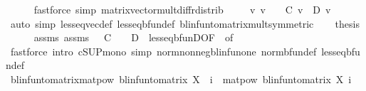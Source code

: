 \begin{isabellebody}
\ \ \ \ \isamarkupfalse%
\ {\isacharparenleft}{\kern0pt}fastforce\ simp{\isacharcolon}{\kern0pt}\ matrix{\isacharunderscore}{\kern0pt}vector{\isacharunderscore}{\kern0pt}mult{\isacharunderscore}{\kern0pt}diff{\isacharunderscore}{\kern0pt}rdistrib{\isacharparenright}{\kern0pt}\isanewline
\ \ \isamarkupfalse%
\ {\isacharasterisk}{\kern0pt}{\isacharcolon}{\kern0pt}\ {\isachardoublequoteopen}{\isasymAnd}v{\isachardot}{\kern0pt}\ v\ {\isasymge}\ {}\ {\isasymLongrightarrow}\ C\ v\ {\isasymle}\ D\ v{\isachardoublequoteclose}\isanewline
\ \ \ \ \isamarkupfalse%
\ {\isacharparenleft}{\kern0pt}auto\ simp{\isacharcolon}{\kern0pt}\ less{\isacharunderscore}{\kern0pt}eq{\isacharunderscore}{\kern0pt}vec{\isacharunderscore}{\kern0pt}def\ less{\isacharunderscore}{\kern0pt}eq{\isacharunderscore}{\kern0pt}bfun{\isacharunderscore}{\kern0pt}def\ blinfun{\isacharunderscore}{\kern0pt}to{\isacharunderscore}{\kern0pt}matrix{\isacharunderscore}{\kern0pt}mult{\isacharbrackleft}{\kern0pt}symmetric{\isacharbrackright}{\kern0pt}{\isacharparenright}{\kern0pt}\isanewline
\ \ \isamarkupfalse%
\ {\isacharquery}{\kern0pt}thesis\isanewline
\ \ \ \ \isamarkupfalse%
\ assms{\isacharparenleft}{\kern0pt}{}{\isacharparenright}{\kern0pt}\ assms{\isacharparenleft}{\kern0pt}{}{\isacharparenright}{\kern0pt}\ {\isacartoucheopen}{}\ {\isasymle}\ C\ {}{\isacartoucheclose}\ {\isacartoucheopen}{}\ {\isasymle}\ D\ {}{\isacartoucheclose}\ less{\isacharunderscore}{\kern0pt}eq{\isacharunderscore}{\kern0pt}bfunD{\isacharbrackleft}{\kern0pt}OF\ {\isacharasterisk}{\kern0pt}{\isacharcomma}{\kern0pt}\ of\ {}{\isacharbrackright}{\kern0pt}\isanewline
\ \ \ \ \isamarkupfalse%
\ {\isacharparenleft}{\kern0pt}fastforce\ intro{\isacharbang}{\kern0pt}{\isacharcolon}{\kern0pt}\ cSUP{\isacharunderscore}{\kern0pt}mono\ simp{\isacharcolon}{\kern0pt}\ norm{\isacharunderscore}{\kern0pt}nonneg{\isacharunderscore}{\kern0pt}blinfun{\isacharunderscore}{\kern0pt}one\ norm{\isacharunderscore}{\kern0pt}bfun{\isacharunderscore}{\kern0pt}def{\isacharprime}{\kern0pt}\ less{\isacharunderscore}{\kern0pt}eq{\isacharunderscore}{\kern0pt}bfun{\isacharunderscore}{\kern0pt}def{\isacharparenright}{\kern0pt}\isanewline
{}\isamarkupfalse%
%
\endisatagproof
{\isafoldproof}%
%
\isadelimproof
\isanewline
%
\endisadelimproof
\isanewline
{}\isamarkupfalse%
\ blinfun{\isacharunderscore}{\kern0pt}to{\isacharunderscore}{\kern0pt}matrix{\isacharunderscore}{\kern0pt}matpow{\isacharcolon}{\kern0pt}\ {\isachardoublequoteopen}blinfun{\isacharunderscore}{\kern0pt}to{\isacharunderscore}{\kern0pt}matrix\ {\isacharparenleft}{\kern0pt}X\ {\isacharcircum}{\kern0pt}{\isacharcircum}{\kern0pt}\ i{\isacharparenright}{\kern0pt}\ {\isacharequal}{\kern0pt}\ matpow\ {\isacharparenleft}{\kern0pt}blinfun{\isacharunderscore}{\kern0pt}to{\isacharunderscore}{\kern0pt}matrix\ X{\isacharparenright}{\kern0pt}\ i{\isachardoublequoteclose}\isanewline

\end{isabellebody}
